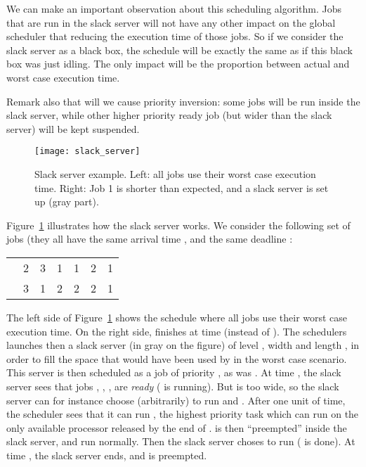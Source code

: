 \documentclass[a4paper]{article}
\begin{document}
We can make an important observation about this scheduling algorithm. Jobs that are run in the slack server will not have any other impact on the global scheduler that reducing the execution time of those jobs. So if we consider the slack server as a black box, the schedule will be exactly the same as if this black box was just idling. The only impact will be the proportion between actual and worst case execution time.

Remark also that will we cause priority inversion: some jobs will be run inside the slack server, while other higher priority ready job (but wider than the slack server) will be kept suspended.

\begin{figure}
\begin{center}
\texttt{[image: slack\_server]}
\caption{\label{fig:slackServer}Slack server example. Left: all jobs use their worst case execution time. Right: Job 1 is shorter than expected, and a slack server is set up (gray part).} 
\end{center}\end{figure}

Figure~\ref{fig:slackServer} illustrates how the slack server works. We consider the following set of jobs (they all have the same arrival time , and the same deadline :
\begin{center}
\begin{tabular}{|c|c|c|c|c|c|c|}
\hline
			& 		&  	&		& 		& 		&  \\ \hline
 	& 2        	&  3			& 1 			& 1			& 2			& 1 \\ \hline
 	& 3        	&  1			& 2 			& 2			& 2			& 1 \\ \hline
\end{tabular} 
\end{center}

The left side of Figure~\ref{fig:slackServer} shows the schedule where all jobs use their worst case execution time.
On the right side,  finishes at time  (instead of ). The schedulers launches then a slack server (in gray on the figure) of level , width  and length , in order to fill the space that would have been used by  in the worst case scenario. This server is then scheduled as a job of priority , as was . At time , the slack server sees that jobs , , ,  are \emph{ready} ( is running). But  is too wide, so the slack server can for instance choose (arbitrarily) to run  and . After one unit of time, the scheduler sees that it can run , the highest priority task which can run on the only available processor released by the end of .  is then ``preempted'' inside the slack server, and run normally. Then the slack server choses to run  ( is done). At time , the slack server ends, and  is preempted. 
\end{document}
